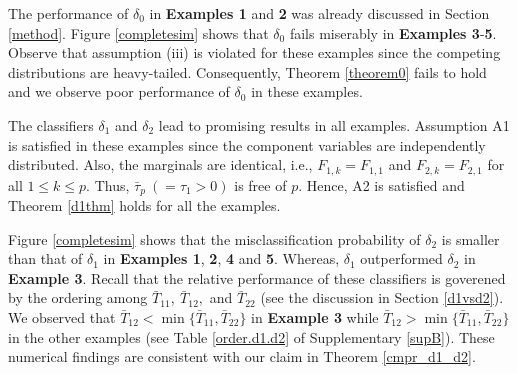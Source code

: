 \documentclass[twoside]{article}
\newcommand{\0}{\mathbf{0}}
\newcommand{\1}{\mathbf{1}}
\numberwithin{equation}{section}
\begin{document}
The performance of $\delta_0$ in {\bf Examples 1} and {\bf 2} was already discussed in Section \ref{method}. %
Figure \ref{completesim} shows that $\delta_0$ fails miserably in {\bf Examples 3}-{\bf 5}. Observe that assumption (iii) is violated for these examples since the competing distributions are heavy-tailed. Consequently, Theorem \ref{theorem0} fails to hold and we observe poor performance of $\delta_0$ in these examples.

\noindent The classifiers $\delta_1$ and $\delta_2$ lead to promising results in all examples. Assumption A1 is satisfied in these examples since the component variables are independently distributed. Also, the marginals are identical, i.e., $F_{1,k}=F_{1,1}$ and $F_{2,k}=F_{2,1}$ for all $1\le k\le p.$ Thus, $\bar{\tau}_p\ (=\tau_1>0)$ is free of $p$. Hence, A2 is satisfied and Theorem \ref{d1thm} holds for all the examples. %

Figure \ref{completesim} shows that the misclassification probability of $\delta_2$ is smaller than that of $\delta_1$ in {\bf Examples 1}, {\bf 2}, {\bf 4} and {\bf 5}. Whereas, $\delta_1$ outperformed $\delta_2$ in {\bf Example 3}. Recall that the relative performance of these classifiers is goverened by the ordering among $\bar{T}_{11},\ \bar{T}_{12},$ and $\bar{T}_{22}$ (see the discussion in Section \ref{d1vsd2}). %
We observed that $\bar{T}_{12}< \min\{\bar{T}_{11},\bar{T}_{22}\}$ in {\bf Example 3} while $\bar{T}_{12}> \min\{\bar{T}_{11},\bar{T}_{22}\}$ in the other examples (see Table \ref{order.d1.d2} of Supplementary \ref{supB}). These numerical findings are consistent with our claim in Theorem \ref{cmpr_d1_d2}.
\end{document}
